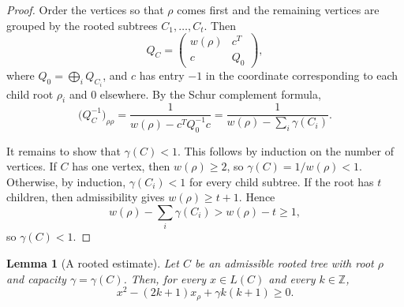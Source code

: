 \documentclass[11pt]{article}
\newtheorem{lemma}{Lemma}
\begin{document}
\begin{proof}
Order the vertices so that \(\rho\) comes first and the remaining vertices are grouped by the rooted subtrees \(C_1,\dots,C_t\). Then
\[
Q_C=
\begin{pmatrix}
w(\rho) & c^T\\
c & Q_0
\end{pmatrix},
\]
where \(Q_0=\bigoplus_i Q_{C_i}\), and \(c\) has entry \(-1\) in the coordinate corresponding to each child root \(\rho_i\) and \(0\) elsewhere. By the Schur complement formula,
\[
\bigl(Q_C^{-1}\bigr)_{\rho\rho}
=
\frac{1}{w(\rho)-c^TQ_0^{-1}c}
=
\frac{1}{w(\rho)-\sum_i \gamma(C_i)}.
\]

It remains to show that \(\gamma(C)<1\). This follows by induction on the number of vertices. If \(C\) has one vertex, then \(w(\rho)\ge 2\), so \(\gamma(C)=1/w(\rho)<1\). Otherwise, by induction, \(\gamma(C_i)<1\) for every child subtree. If the root has \(t\) children, then admissibility gives \(w(\rho)\ge t+1\). Hence
\[
w(\rho)-\sum_i \gamma(C_i)>w(\rho)-t\ge 1,
\]
so \(\gamma(C)<1\).
\end{proof}

\begin{lemma}[A rooted estimate]
Let \(C\) be an admissible rooted tree with root \(\rho\) and capacity \(\gamma=\gamma(C)\). Then, for every \(x\in L(C)\) and every \(k\in \mathbb Z\),
\[
x^2-(2k+1)x_\rho+\gamma k(k+1)\ge 0.
\]
\end{lemma}
\end{document}
